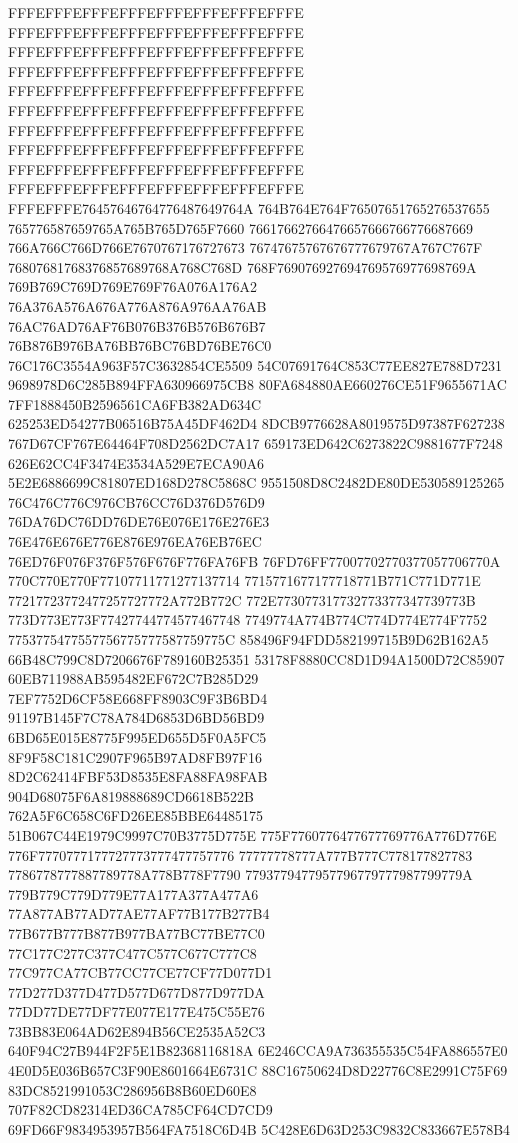 FFFEFFFEFFFEFFFEFFFEFFFEFFFEFFFE
FFFEFFFEFFFEFFFEFFFEFFFEFFFEFFFE
FFFEFFFEFFFEFFFEFFFEFFFEFFFEFFFE
FFFEFFFEFFFEFFFEFFFEFFFEFFFEFFFE
FFFEFFFEFFFEFFFEFFFEFFFEFFFEFFFE
FFFEFFFEFFFEFFFEFFFEFFFEFFFEFFFE
FFFEFFFEFFFEFFFEFFFEFFFEFFFEFFFE
FFFEFFFEFFFEFFFEFFFEFFFEFFFEFFFE
FFFEFFFEFFFEFFFEFFFEFFFEFFFEFFFE
FFFEFFFEFFFEFFFEFFFEFFFEFFFEFFFE
FFFEFFFE76457646764776487649764A
764B764E764F76507651765276537655
765776587659765A765B765D765F7660
76617662766476657666766776687669
766A766C766D766E7670767176727673
76747675767676777679767A767C767F
76807681768376857689768A768C768D
768F769076927694769576977698769A
769B769C769D769E769F76A076A176A2
76A376A576A676A776A876A976AA76AB
76AC76AD76AF76B076B376B576B676B7
76B876B976BA76BB76BC76BD76BE76C0
76C176C3554A963F57C3632854CE5509
54C07691764C853C77EE827E788D7231
9698978D6C285B894FFA630966975CB8
80FA684880AE660276CE51F9655671AC
7FF1888450B2596561CA6FB382AD634C
625253ED54277B06516B75A45DF462D4
8DCB9776628A8019575D97387F627238
767D67CF767E64464F708D2562DC7A17
659173ED642C6273822C9881677F7248
626E62CC4F3474E3534A529E7ECA90A6
5E2E6886699C81807ED168D278C5868C
9551508D8C2482DE80DE530589125265
76C476C776C976CB76CC76D376D576D9
76DA76DC76DD76DE76E076E176E276E3
76E476E676E776E876E976EA76EB76EC
76ED76F076F376F576F676F776FA76FB
76FD76FF77007702770377057706770A
770C770E770F77107711771277137714
7715771677177718771B771C771D771E
77217723772477257727772A772B772C
772E773077317732773377347739773B
773D773E773F77427744774577467748
7749774A774B774C774D774E774F7752
7753775477557756775777587759775C
858496F94FDD582199715B9D62B162A5
66B48C799C8D7206676F789160B25351
53178F8880CC8D1D94A1500D72C85907
60EB711988AB595482EF672C7B285D29
7EF7752D6CF58E668FF8903C9F3B6BD4
91197B145F7C78A784D6853D6BD56BD9
6BD65E015E8775F995ED655D5F0A5FC5
8F9F58C181C2907F965B97AD8FB97F16
8D2C62414FBF53D8535E8FA88FA98FAB
904D68075F6A819888689CD6618B522B
762A5F6C658C6FD26EE85BBE64485175
51B067C44E1979C9997C70B3775D775E
775F7760776477677769776A776D776E
776F7770777177727773777477757776
77777778777A777B777C778177827783
7786778777887789778A778B778F7790
7793779477957796779777987799779A
779B779C779D779E77A177A377A477A6
77A877AB77AD77AE77AF77B177B277B4
77B677B777B877B977BA77BC77BE77C0
77C177C277C377C477C577C677C777C8
77C977CA77CB77CC77CE77CF77D077D1
77D277D377D477D577D677D877D977DA
77DD77DE77DF77E077E177E475C55E76
73BB83E064AD62E894B56CE2535A52C3
640F94C27B944F2F5E1B82368116818A
6E246CCA9A736355535C54FA886557E0
4E0D5E036B657C3F90E8601664E6731C
88C16750624D8D22776C8E2991C75F69
83DC8521991053C286956B8B60ED60E8
707F82CD82314ED36CA785CF64CD7CD9
69FD66F9834953957B564FA7518C6D4B
5C428E6D63D253C9832C833667E578B4
